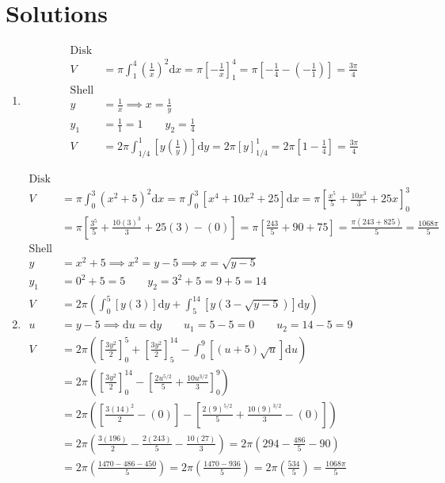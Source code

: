\documentclass[12pt, A4]{report}
\renewcommand{\d}{\text{d}}
\begin{document}
		\section*{Solutions}
			\begin{enumerate}
				\item
					\begin{align*}
						\text{Disk} \\
							V &= \pi\int_1^4\left(\frac{1}{x}\right)^2\d x
									 = \pi\left[-\frac{1}{x}\right]_1^4
									 = \pi\left[-\frac{1}{4} -\left(-\frac{1}{1}\right)\right]
									 = \frac{3\pi}{4} \\
						\text{Shell} \\
							y &= \frac{1}{x} \implies x = \frac{1}{y} \\
							y_1 &= \frac{1}{1} = 1 \qquad y_2 = \frac{1}{4} \\
							V &= 2\pi\int_{1/4}^1\left[y\left(\frac{1}{y}\right)\right]\d y = 2\pi[y]_{1/4}^1 = 2\pi\left[1 - \frac{1}{4}\right] = \frac{3\pi}{4}
					\end{align*}
				\item
					\begin{align*}
						\text{Disk} \\
							V &= \pi\int_0^3\left(x^2 + 5\right)^2\d x 
									= \pi\int_{0}^3\left[x^4 + 10x^2 + 25\right]\d x 
									= \pi\left[\frac{x^5}{5} + \frac{10x^3}{3} + 25x\right]_0^3 \\
								&= \pi\left[\frac{3^5}{5} + \frac{10(3)^3}{3} + 25(3) - (0)\right] 
									= \pi\left[\frac{243}{5} + 90 + 75\right] 
									= \frac{\pi(243 + 825)}{5} 
									= \frac{1068\pi}{5} \\
						\text{Shell} \\
							y &= x^2 + 5 \implies x^2 = y - 5 \implies x = \sqrt{y - 5} \\
							y_1 &= 0^2 + 5 = 5 \qquad 
								y_2 = 3^2 + 5 = 9 + 5 = 14 \\
							V &= 2\pi\left(\int_0^5\left[y(3)\right]\d y + \int_5^{14}\left[y\left(3 - \sqrt{y - 5}\right)\right]\d y\right) \\
							u  &= y - 5 \implies \d u = \d y \qquad u_1 = 5 - 5 = 0 \qquad u_2 = 14 - 5 = 9\\
							V &= 2\pi\left(\left[\frac{3y^2}{2}\right]_0^5 + \left[\frac{3y^2}{2}\right]_5^{14} - \int_0^{9}\left[(u + 5)\sqrt{u}\right]\d u\right) \\
								&= 2\pi\left(\left[\frac{3y^2}{2}\right]_0^{14} - \left[\frac{2u^{5/2}}{5} + \frac{10u^{3/2}}{3}\right]_0^9\right) \\
								&= 2\pi\left(\left[\frac{3(14)^2}{2} - (0)\right] - \left[\frac{2(9)^{5/2}}{5} + \frac{10(9)^{3/2}}{3} - (0) \right]\right) \\
								&= 2\pi\left(\frac{3(196)}{2} - \frac{2(243)}{5} - \frac{10(27)}{3}\right) 
									= 2\pi\left(294 - \frac{486}{5} - 90\right) \\
								&= 2\pi\left(\frac{1470 - 486 - 450}{5}\right) = 2\pi\left(\frac{1470 - 936}{5}\right) = 2\pi\left(\frac{534}{5}\right) = \frac{1068\pi}{5}
					\end{align*}
			\end{enumerate}
\end{document}
